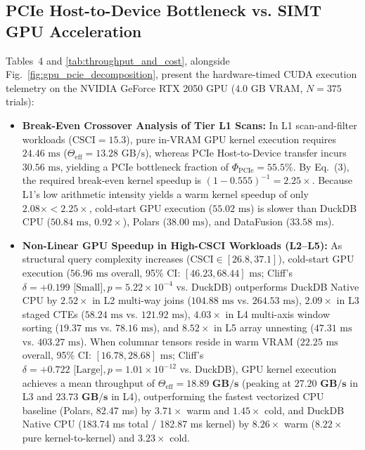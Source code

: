 \documentclass[10pt,a4paper]{article}
\begin{document}
\subsection{PCIe Host-to-Device Bottleneck vs. SIMT GPU Acceleration}
Tables~4 and \ref{tab:throughput_and_cost}, alongside Fig.~\ref{fig:gpu_pcie_decomposition}, present the hardware-timed CUDA execution telemetry on the NVIDIA GeForce RTX 2050 GPU ($4.0\text{ GB}$ VRAM, $N=375$ trials):
\begin{itemize}[leftmargin=1.5em,itemsep=2pt]
    \item \textbf{Break-Even Crossover Analysis of Tier L1 Scans:} In L1 scan-and-filter workloads ($\text{CSCI}=15.3$), pure in-VRAM GPU kernel execution requires $24.46\text{ ms}$ ($\Theta_{\text{eff}} = 13.28\text{ GB/s}$), whereas PCIe Host-to-Device transfer incurs $30.56\text{ ms}$, yielding a PCIe bottleneck fraction of $\Phi_{\text{PCIe}} = 55.5\%$. By Eq.~(3), the required break-even kernel speedup is $(1 - 0.555)^{-1} = \mathbf{2.25\times}$. Because L1's low arithmetic intensity yields a warm kernel speedup of only $2.08\times < 2.25\times$, cold-start GPU execution ($55.02\text{ ms}$) is slower than DuckDB CPU ($50.84\text{ ms}$, $0.92\times$), Polars ($38.00\text{ ms}$), and DataFusion ($33.58\text{ ms}$).
    \item \textbf{Non-Linear GPU Speedup in High-CSCI Workloads (L2--L5):} As structural query complexity increases ($\text{CSCI} \in [26.8, 37.1]$), cold-start GPU execution ($56.96\text{ ms}$ overall, 95\% CI: $[46.23, 68.44]\text{ ms}$; Cliff's $\delta = +0.199\text{ [Small]}, p = 5.22 \times 10^{-4}$ vs. DuckDB) outperforms DuckDB Native CPU by $\mathbf{2.52\times}$ in L2 multi-way joins ($104.88\text{ ms}$ vs. $264.53\text{ ms}$), $\mathbf{2.09\times}$ in L3 staged CTEs ($58.24\text{ ms}$ vs. $121.92\text{ ms}$), $\mathbf{4.03\times}$ in L4 multi-axis window sorting ($19.37\text{ ms}$ vs. $78.16\text{ ms}$), and $\mathbf{8.52\times}$ in L5 array unnesting ($47.31\text{ ms}$ vs. $403.27\text{ ms}$). When columnar tensors reside in warm VRAM ($22.25\text{ ms}$ overall, 95\% CI: $[16.78, 28.68]\text{ ms}$; Cliff's $\delta = +0.722\text{ [Large]}, p = 1.01 \times 10^{-12}$ vs. DuckDB), GPU kernel execution achieves a mean throughput of $\Theta_{\text{eff}} = \mathbf{18.89\text{ GB/s}}$ (peaking at $\mathbf{27.20\text{ GB/s}}$ in L3 and $\mathbf{23.73\text{ GB/s}}$ in L4), outperforming the fastest vectorized CPU baseline (Polars, 82.47 ms) by $3.71\times$ warm and $1.45\times$ cold, and DuckDB Native CPU (183.74 ms total / 182.87 ms kernel) by $8.26\times$ warm ($8.22\times$ pure kernel-to-kernel) and $3.23\times$ cold.
\end{itemize}
\end{document}
